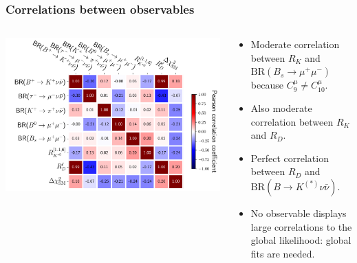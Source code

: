\documentclass[mathserif, 10pt]{beamer}
\begin{document}
\begin{frame}
\begin{columns}
\begin{column}{0.5\textwidth}
        \end{column}
    \end{columns}

\end{frame}

\begin{frame}
    \frametitle{Correlations between observables}

    \begin{columns}
        \begin{column}{0.5\textwidth}
            \includegraphics[width=\columnwidth]{figures/obscorr.pdf}
        \end{column}
        \begin{column}{0.5\textwidth}
            \begin{itemize}
                \item Moderate correlation between $R_K$ and $\mathrm{BR}(B_s \to \mu^+ \mu^-)$ because $C_9^\mu \neq C_{10}^\mu$.
                \item Also moderate correlation between $R_K$ and $R_D$.
                \item Perfect correlation between $R_D$ and $\mathrm{BR}(B\to K^{(*)}\nu\bar{\nu})$.
                \item No observable displays large correlations to the global likelihood: global fits are needed.
            \end{itemize}
        \end{column}
    \end{columns}

\end{frame}
\end{document}
